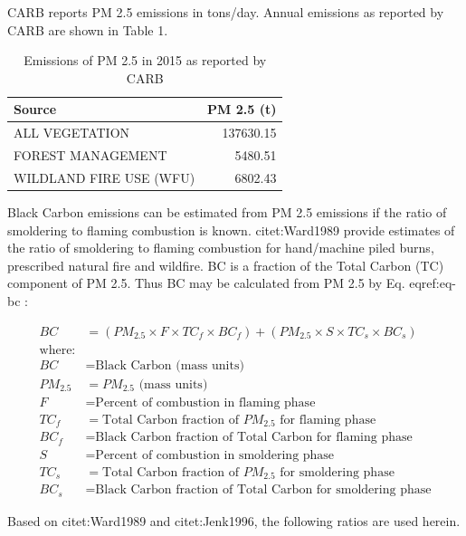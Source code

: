 \documentclass[a4paper]{article}
\begin{document}
CARB reports PM 2.5 emissions in tons/day. Annual emissions  as
reported by CARB are shown in Table 1.

\begin{table}[htb]
\caption{Emissions of PM 2.5 in 2015 as reported by CARB}
\centering
\begin{tabular}{lr}
Source & PM 2.5 (t)\\
\hline
ALL VEGETATION & 137630.15\\
FOREST MANAGEMENT & 5480.51\\
WILDLAND FIRE USE (WFU) & 6802.43\\
\end{tabular}
\end{table}


Black Carbon emissions
can be estimated from PM 2.5 emissions if the ratio of smoldering to
flaming combustion is known. citet:Ward1989 provide estimates of
the ratio of smoldering to flaming combustion for hand/machine piled
burns, prescribed natural fire and wildfire. BC is a fraction
of the Total Carbon (TC) component of PM 2.5. Thus BC may be calculated from PM
2.5 by Eq. eqref:eq-bc :



\begin{align}
BC &= \left( PM_{2.5} \times F \times TC_f \times BC_f\right) + \left( PM_{2.5} \times S \times TC_s \times BC_s\right) \label{eq-bc} \\
\text{where:} \nonumber \\
BC &= \text{Black Carbon (mass units)} \nonumber \\
PM_{2.5} &= PM_{2.5} \text{ (mass units)} \nonumber \\
F &= \text{Percent of combustion in flaming phase} \nonumber \\
TC_f &= \text{Total Carbon fraction of } PM_{2.5} \text{ for flaming phase} \nonumber \\
BC_f &= \text{Black Carbon fraction of Total Carbon for flaming phase} \nonumber \\
S &= \text{Percent of combustion in smoldering phase} \nonumber \\
TC_s &= \text{Total Carbon fraction of } PM_{2.5} \text{ for smoldering phase} \nonumber \\
BC_s &= \text{Black Carbon fraction of Total Carbon for smoldering phase} \nonumber
\end{align}


Based on citet:Ward1989 and citet:Jenk1996, the following ratios are
used herein.
\end{document}
